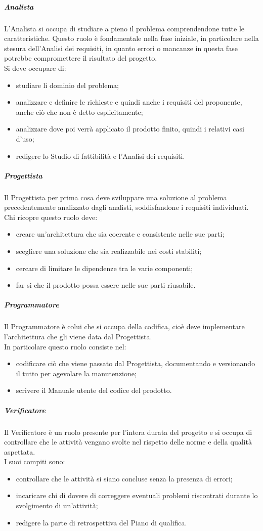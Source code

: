 \subparagraph{Analista}
L'Analista si occupa di studiare a pieno il problema comprendendone tutte le caratteristiche. Questo ruolo è fondamentale nella fase iniziale, in particolare nella stesura dell'Analisi dei requisiti, in quanto errori o mancanze in questa fase potrebbe compromettere il risultato del progetto.\\
Si deve occupare di:
\begin{itemize}
    \item studiare li dominio del problema;
    \item analizzare e definire le richieste e quindi anche i requisiti del proponente, anche ciò che non è detto esplicitamente;
    \item analizzare dove poi verrà applicato il prodotto finito, quindi i relativi casi d'uso;
    \item redigere lo Studio di fattibilità e l'Analisi dei requisiti.
\end{itemize}

\subparagraph{Progettista}
Il Progettista per prima cosa deve sviluppare una soluzione al problema precedentemente analizzato dagli analisti, soddisfandone i requisiti individuati.\\
Chi ricopre questo ruolo deve:
\begin{itemize}
    \item creare un'architettura che sia coerente e consistente nelle sue parti;
    \item scegliere una soluzione che sia realizzabile nei costi stabiliti;
    \item cercare di limitare le dipendenze tra le varie componenti;
    \item far si che il prodotto possa essere nelle sue parti riusabile.
\end{itemize}

\subparagraph{Programmatore}
Il Programmatore è colui che si occupa della codifica, cioè deve implementare l'architettura che gli viene data dal Progettista.\\
In particolare questo ruolo consiste nel:
\begin{itemize}
    \item codificare ciò che viene passato dal Progettista, documentando e versionando il tutto per agevolare la manutenzione;
    \item scrivere il Manuale utente del codice del prodotto.
\end{itemize}

\subparagraph{Verificatore}
Il Verificatore è un ruolo presente per l'intera durata del progetto e si occupa di controllare che le attività vengano svolte nel rispetto delle norme e della qualità aspettata.\\
I suoi compiti sono:
\begin{itemize}
    \item controllare che le attività si siano concluse senza la presenza di errori;
    \item incaricare chi di dovere di correggere eventuali problemi riscontrati durante lo svolgimento di un'attività;
    \item redigere la parte di retrospettiva del Piano di qualifica.
\end{itemize}

